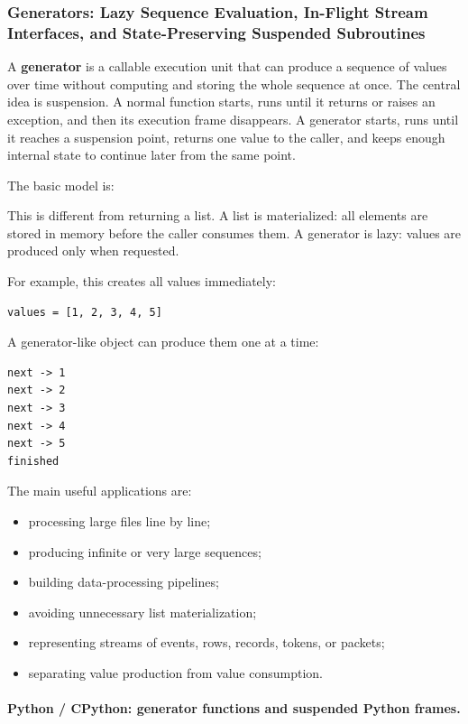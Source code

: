 \subsubsection{Generators: Lazy Sequence Evaluation, In-Flight Stream Interfaces, and State-Preserving Suspended Subroutines}

A \textbf{generator} is a callable execution unit that can produce a sequence of values over time without computing and storing the whole sequence at once. The central idea is suspension. A normal function starts, runs until it returns or raises an exception, and then its execution frame disappears. A generator starts, runs until it reaches a suspension point, returns one value to the caller, and keeps enough internal state to continue later from the same point.

The basic model is:

This is different from returning a list. A list is materialized: all elements are stored in memory before the caller consumes them. A generator is lazy: values are produced only when requested.

For example, this creates all values immediately:

\begin{verbatim}
values = [1, 2, 3, 4, 5]
\end{verbatim}

A generator-like object can produce them one at a time:

\begin{verbatim}
next -> 1
next -> 2
next -> 3
next -> 4
next -> 5
finished
\end{verbatim}

The main useful applications are:

\begin{itemize}
    \item processing large files line by line;
    \item producing infinite or very large sequences;
    \item building data-processing pipelines;
    \item avoiding unnecessary list materialization;
    \item representing streams of events, rows, records, tokens, or packets;
    \item separating value production from value consumption.
\end{itemize}

\paragraph{Python / CPython: generator functions and suspended Python frames.}

